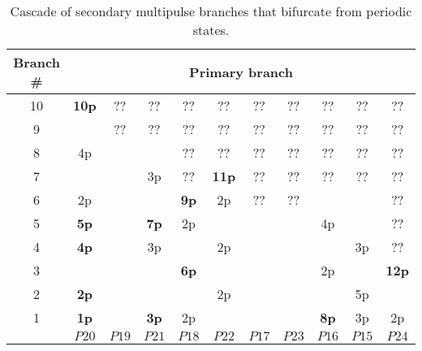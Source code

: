 \documentclass[../main/FlatMarginalStability.tex]{subfiles}
\begin{document}
\begin{table}[ht]
\caption{Cascade of secondary multipulse branches that bifurcate from periodic states.} %
\centering %
\begin{tabular}{c | c c c c c c c c c c} %
\hline\hline %
 Branch \# &\multicolumn{10}{c}{ Primary branch}\\
\hline  %
10 	&\textbf{10p} &??		&??		&??		&??		&??		&??		&??		&??		&??	\\
9	&      		&??		&??		&??	 	&??		&??		&??		&??		&??		&??	\\
8	&4p  		&		&		&??	 	&??		&??		&??		&??		&??		&??	\\
7	&      		&		&3p		&??	 	&\textbf{11p}	&??		&??		&??		&??		&??	\\
6	& 2p    		&		&		&\textbf{9p} 	&2p		&??		&??		&		&		&??	\\
5	&\textbf{5p}  	&		&\textbf{7p}	&2p	 	&		&		&		&4p		&		&??	\\
4	&\textbf{4p} 	&		&3p		&	 	&2p		&		&		&		&3p		&??	\\
3	&      		&		&		&\textbf{6p} 	&		&		&		&2p		&		&\textbf{12p}	\\
2	&\textbf{2p} 	&		&		&	 	&2p		&		&		&		&5p		&	\\
1	&\textbf{1p}  	&		&\textbf{3p}	&2p	 	&		&		&		&\textbf{8p}	&3p		&2p	\\
\hline %
 	&$P20$	&$P19$	&$P21$	&$P18$	&$P22$	&$P17$	&$P23$	&$P16$	&$P15$	&$P24$ \\ [1ex] %
\hline %
\end{tabular}
\label{table:multipulse} %
\end{table} 
\end{document}

